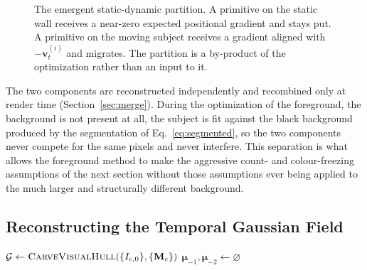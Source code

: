 \begin{figure}[!ht]
    \centering
    \resizebox{0.9\linewidth}{!}{}
    \caption{The emergent static-dynamic partition. A primitive on the static wall
    receives a near-zero expected positional gradient and stays put. A primitive on
    the moving subject receives a gradient aligned with $-\mathbf{v}^{(i)}_t$ and
    migrates. The partition is a by-product of the optimization rather than an input
    to it.}
    \label{fig:decomp}
\end{figure}

The two components are reconstructed independently and recombined only at render time
(Section~\ref{sec:merge}). During the optimization of the foreground, the background
is not present at all, the subject is fit against the black background produced by the
segmentation of Eq.~\eqref{eq:segmented}, so the two components never compete for the same
pixels and never interfere. This separation is
what allows the foreground method to make the aggressive count- and colour-freezing
assumptions of the next section without those assumptions ever being applied to the
much larger and structurally different background.

\subsection{Reconstructing the Temporal Gaussian Field}
\label{sec:temporal}

\begin{algorithm}[!b]
\SetAlgoLined
{}
$\mathcal{G} \gets \textsc{CarveVisualHull}(\{I_{c,0}\}, \{\mathbf{M}_c\})$ 
$\boldsymbol{\mu}_{-1}, \boldsymbol{\mu}_{-2} \gets \varnothing$ 
\caption{Temporal Gaussian fitting (\textsc{temporal-splatfacto}).}
\label{alg:temporal}
\end{algorithm}

